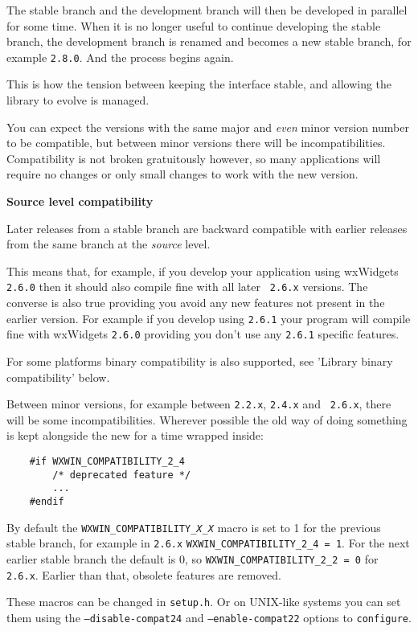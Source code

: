 The stable branch and the development branch will then be developed in
parallel for some time. When it is no longer useful to continue developing
the stable branch, the development branch is renamed and becomes a new
stable branch, for example {\tt 2.8.0}. And the process begins again.

This is how the tension between keeping the interface stable, and allowing
the library to evolve is managed.

You can expect the versions with the same major and {\em even} minor
version number to be compatible, but between minor versions there will be
incompatibilities. Compatibility is not broken gratuitously however, so
many applications will require no changes or only small changes to work
with the new version.

{\large {\bf Source level compatibility}}\label{sourcecompatibility}

Later releases from a stable branch are backward compatible with earlier
releases from the same branch at the {\em source} level.

This means that, for example, if you develop your application using
wxWidgets {\tt 2.6.0} then it should also compile fine with all later {\tt
2.6.x} versions. The converse is also true providing you avoid any new
features not present in the earlier version. For example if you develop
using {\tt 2.6.1} your program will compile fine with wxWidgets {\tt 2.6.0}
providing you don't use any {\tt 2.6.1} specific features.

For some platforms binary compatibility is also supported, see 'Library
binary compatibility' below.

Between minor versions, for example between {\tt 2.2.x}, {\tt 2.4.x} and {\tt
2.6.x}, there will be some incompatibilities. Wherever possible the old way
of doing something is kept alongside the new for a time wrapped inside:

\begin{verbatim}
    #if WXWIN_COMPATIBILITY_2_4
        /* deprecated feature */
        ...
    #endif
\end{verbatim}

By default the {\tt WXWIN\_COMPATIBILITY{\it \_X\_X}} macro is set
to 1 for the previous stable branch, for example
in {\tt 2.6.x} {\tt WXWIN\_COMPATIBILITY\_2\_4 = 1}. For the next earlier
stable branch the default is 0, so {\tt WXWIN\_COMPATIBILITY\_2\_2 = 0}
for {\tt 2.6.x}. Earlier than that, obsolete features are removed.

These macros can be changed in {\tt setup.h}. Or on UNIX-like systems you can
set them using the {\tt --disable-compat24} and {\tt --enable-compat22}
options to {\tt configure}.

